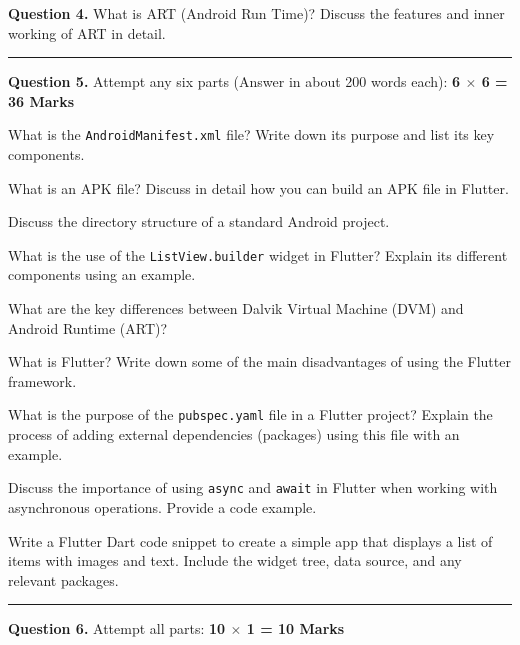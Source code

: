 \documentclass[11pt,a4paper]{article}
\begin{document}
\medskip



\noindent   \textbf{Question 4.} What is ART (Android Run Time)? Discuss the features and inner working of ART in detail.

\bigskip


\rule{\linewidth}{0.4pt}\smallskip




\noindent   \textbf{Question 5.} Attempt any six parts (Answer in about 200 words each): \hfill   \textbf{6 $ \times$ 6 = 36 Marks}

\begin{parts}
  \item What is the   \texttt{AndroidManifest.xml} file? Write down its purpose and list its key components.
  \item What is an APK file? Discuss in detail how you can build an APK file in Flutter.
  \item Discuss the directory structure of a standard Android project.
  \item What is the use of the   \texttt{ListView.builder} widget in Flutter? Explain its different components using an example.
  \item What are the key differences between Dalvik Virtual Machine (DVM) and Android Runtime (ART)?
  \item What is Flutter? Write down some of the main disadvantages of using the Flutter framework.
  \item What is the purpose of the   \texttt{pubspec.yaml} file in a Flutter project? Explain the process of adding external dependencies (packages) using this file with an example.
  \item Discuss the importance of using   \texttt{async} and   \texttt{await} in Flutter when working with asynchronous operations. Provide a code example.
  \item Write a Flutter Dart code snippet to create a simple app that displays a list of items with images and text. Include the widget tree, data source, and any relevant packages.
\end{parts}

\bigskip


\rule{\linewidth}{0.4pt}\smallskip




\noindent   \textbf{Question 6.} Attempt all parts: \hfill   \textbf{10 $ \times$ 1 = 10 Marks}
\end{document}
